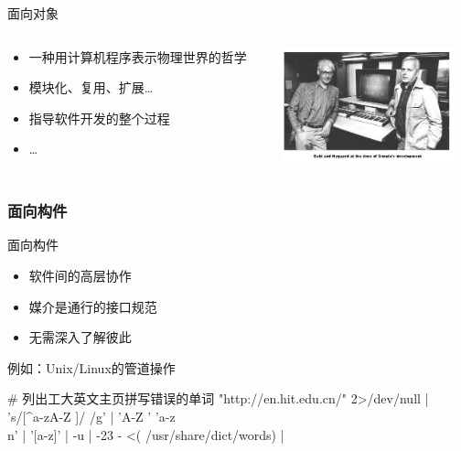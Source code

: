 \begin{frame}{面向对象}
  \begin{columns}
    \begin{column}{.5\textwidth}
      \begin{itemize}
        \item 一种用计算机程序表示物理世界的哲学
          \pause
        \item 模块化、复用、扩展\dots
          \pause
        \item 指导软件开发的整个过程
        \item \dots
      \end{itemize}
    \end{column}
    \begin{column}{.5\textwidth}
      \includegraphics[width=5cm]{dahl_nygaard.jpg}
    \end{column}
  \end{columns}
\end{frame}

\subsubsection{面向构件}

\begin{frame}[fragile]{面向构件}
  \begin{itemize}
    \item 软件间的高层协作
    \item 媒介是通行的接口规范
    \item 无需深入了解彼此
  \end{itemize}
  \pause
  \begin{block}{例如：Unix/Linux的\alert{管道}操作}
    \begin{semiverbatim}
    {\color{magenta}# 列出工大英文主页拼写错误的单词}
     \alert{"http://en.hit.edu.cn/"} 2>/dev/null {\color{cyan}|}
     \alert{'s/[^a-zA-Z ]/ /g'} {\color{cyan}|}
     \alert{'A-Z ' 'a-z\\n'} {\color{cyan}|}
     \alert{'[a-z]'} {\color{cyan}|}
     -u {\color{cyan}|}
     -23 - <( /usr/share/dict/words) {\color{cyan}|}
    \end{semiverbatim}
  \end{block}
\end{frame}

